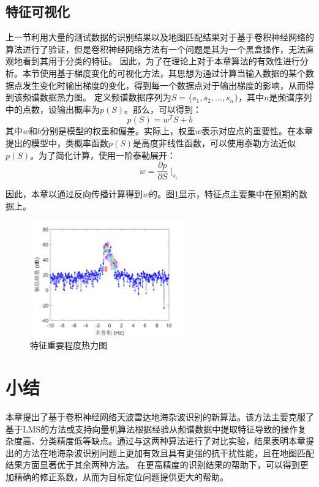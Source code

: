 \subsection{特征可视化}

上一节利用大量的测试数据的识别结果以及地图匹配结果对于基于卷积神经网络的算法进行了验证，但是卷积神经网络方法有一个问题是其为一个黑盒操作，无法直观地看到其用于分类的特征。
因此，为了在理论上对于本章算法的有效性进行分析。本节使用基于梯度变化的可视化方法，其思想为通过计算当输入数据的某个数据点发生变化时输出梯度的变化，得到每一个数据点对于输出梯度的影响，从而得到该频谱数据热力图。
定义频谱数据序列为$ S = \{s_1, s_2, \dots,s_n\} $，其中$n$是频谱序列中的点数，设输出概率为$p(S)$。那么，可以得到：
\begin{equation}
	p(S) = w^TS+b
	\label{equ:ps}
\end{equation}
其中$ w $和$ b $分别是模型的权重和偏差。实际上，权重$ w $表示对应点的重要性。在本章提出的模型中，类概率函数$p(S)$是高度非线性函数，可以使用泰勒方法近似$p(S)$。为了简化计算，使用一阶泰勒展开：
\begin{equation}
	w = \frac{\partial{p}}{\partial{S}}{\mid}_{s_i}
	\label{equ:w}
\end{equation}

因此，本章以通过反向传播计算得到$ w $的。图\ref{fig:vis}显示，特征点主要集中在预期的数据上。
\begin{figure}[H]
	\centering
	\includegraphics[width=6.67cm]{figures/othr/heatmap}
	\caption{特征重要程度热力图}
	\label{fig:vis}
\end{figure}

\section{小结}
\label{sec:othr_summary}
本章提出了基于卷积神经网络天波雷达地海杂波识别的新算法。该方法主要克服了基于LMS的方法或支持向量机算法根据经验从频谱数据中提取特征导致的操作复杂度高、分类精度低等缺点。通过与这两种算法进行了对比实验，结果表明本章提出的方法在地海杂波识别问题上更加有效且具有更强的抗干扰性能，且在地图匹配结果方面显著优于其余两种方法。
在更高精度的识别结果的帮助下，可以得到更加精确的修正系数，从而为目标定位问题提供更大的帮助。
